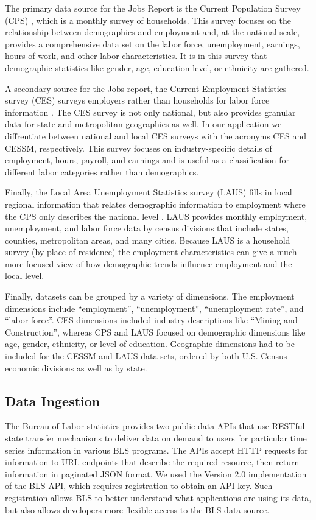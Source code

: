\documentclass{sigchi}
\begin{document}
The primary data source for the Jobs Report is the Current Population Survey (CPS) \cite{_labor_????}, which is a monthly survey of households. This survey focuses on the relationship between demographics and employment and, at the national scale, provides a comprehensive data set on the labor force, unemployment, earnings, hours of work, and other labor characteristics. It is in this survey that demographic statistics like gender, age, education level, or ethnicity are gathered.

A secondary source for the Jobs report, the Current Employment Statistics survey (CES) surveys employers rather than households for labor force information \cite{_current_2015}. The CES survey is not only national, but also provides granular data for state and metropolitan geographies as well. In our application we diffrentiate between national and local CES surveys with the acronyms CES and CESSM, respectively. This survey focuses on industry-specific details of employment, hours, payroll, and earnings and is useful as a classification for different labor categories rather than demographics.

Finally, the Local Area Unemployment Statistics survey (LAUS) fills in local regional information that relates demographic information to employment where the CPS only describes the national level \cite{_local_2015}. LAUS provides monthly employment, unemployment, and labor force data by census divisions that include states, counties, metropolitan areas, and many cities. Because LAUS is a household survey (by place of residence) the employment characteristics can give a much more focused view of how demographic trends influence employment and the local level.

Finally, datasets can be grouped by a variety of dimensions. The employment dimensions include ``employment'', ``unemployment'', ``unemployment rate'', and ``labor force''. CES dimensions included industry descriptions like ``Mining and Construction'', whereas CPS and LAUS focused on demographic dimensions like age, gender, ethnicity, or level of education. Geographic dimensions had to be included for the CESSM and LAUS data sets, ordered by both U.S. Census economic divisions as well as by state.

\subsection{Data Ingestion}

The Bureau of Labor statistics provides two public data APIs that use RESTful state transfer mechanisms to deliver data on demand to users for particular time series information in various BLS programs. The APIs accept HTTP requests for information to URL endpoints that describe the required resource, then return information in paginated JSON format. We used the Version 2.0 implementation of the BLS API, which requires registration to obtain an API key. Such registration allows BLS to better understand what applications are using its data, but also allows developers more flexible access to the BLS data source.
\end{document}
